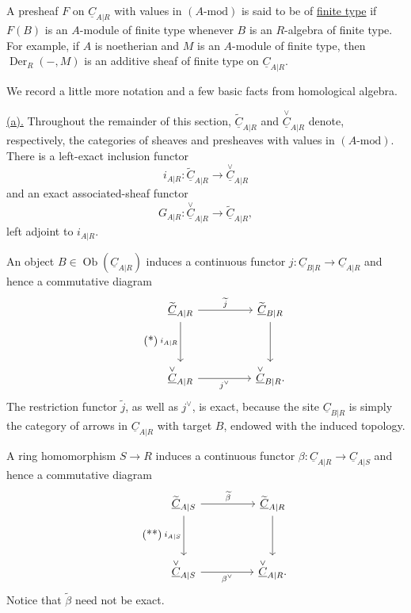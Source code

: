 A presheaf $F$ on $\underline C_{A|R}$ with values in
$(A\text{-mod})$ is said to be of \underline{finite type} if $F(B)$
is an $A$-module of finite type whenever $B$ is an $R$-algebra of
finite type. For example, if $A$ is noetherian and $M$ is an
$A$-module of finite type, then $\operatorname{Der}_R(-,M)$ is an
additive sheaf of finite type on $\underline C_{A|R}$.

We record a little more notation and a few basic facts from
homological algebra.

\underline{(a).} Throughout the remainder of this section,
$\widetilde{\underline C}_{A|R}$ and
$\overset{\vee}{\underline C}_{A|R}$ denote, respectively, the
categories of sheaves and presheaves with values in
$(A\text{-mod})$. There is a left-exact inclusion functor
\[
 i_{A|R}:\widetilde{\underline C}_{A|R}
 \longrightarrow\overset{\vee}{\underline C}_{A|R}
\]
and an exact associated-sheaf functor
\[
 G_{A|R}:\overset{\vee}{\underline C}_{A|R}
 \longrightarrow\widetilde{\underline C}_{A|R},
\]
left adjoint to $i_{A|R}$.


An object $B\in\operatorname{Ob}(\underline C_{A|R})$ induces a
continuous functor
$j:\underline C_{B|R}\longrightarrow\underline C_{A|R}$ and hence
a commutative diagram
\begin{equation}\tag{*}
\begin{tikzcd}[column sep=huge,row sep=huge]
 \widetilde{\underline C}_{A|R}
   \arrow[r,"\widetilde j"] \arrow[d,"i_{A|R}"']
 & \widetilde{\underline C}_{B|R} \arrow[d] \\
 \overset{\vee}{\underline C}_{A|R}
   \arrow[r,"j^{\vee}"']
 & \overset{\vee}{\underline C}_{B|R}.
\end{tikzcd}
\end{equation}
The restriction functor $\widetilde j$, as well as $j^{\vee}$, is
exact, because the site $\underline C_{B|R}$ is simply the category
of arrows in $\underline C_{A|R}$ with target $B$, endowed with the
induced topology.

A ring homomorphism $S\longrightarrow R$ induces a continuous
functor
$\beta:\underline C_{A|R}\longrightarrow\underline C_{A|S}$ and
hence a commutative diagram
\begin{equation}\tag{**}
\begin{tikzcd}[column sep=huge,row sep=huge]
 \widetilde{\underline C}_{A|S}
   \arrow[r,"\widetilde\beta"] \arrow[d,"i_{A|S}"']
 & \widetilde{\underline C}_{A|R} \arrow[d] \\
 \overset{\vee}{\underline C}_{A|S}
   \arrow[r,"\beta^{\vee}"']
 & \overset{\vee}{\underline C}_{A|R}.
\end{tikzcd}
\end{equation}
Notice that $\widetilde\beta$ need not be exact.


